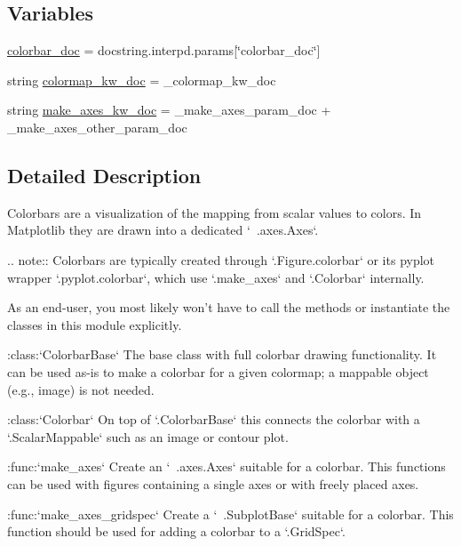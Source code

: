 \subsection*{Variables}
\begin{DoxyCompactItemize}
\item 
\hyperlink{namespacematplotlib_1_1colorbar_a7ca9324c365b59716ce5f7d1521c64d7}{colorbar\+\_\+doc} = docstring.\+interpd.\+params\mbox{[}\char`\"{}colorbar\+\_\+doc\char`\"{}\mbox{]}
\item 
string \hyperlink{namespacematplotlib_1_1colorbar_a68af3613ba2c4b30bcfe5ba521813a37}{colormap\+\_\+kw\+\_\+doc} = \+\_\+colormap\+\_\+kw\+\_\+doc
\item 
string \hyperlink{namespacematplotlib_1_1colorbar_aa0da54385128a6f272b1328022e852d0}{make\+\_\+axes\+\_\+kw\+\_\+doc} = \+\_\+make\+\_\+axes\+\_\+param\+\_\+doc + \+\_\+make\+\_\+axes\+\_\+other\+\_\+param\+\_\+doc
\end{DoxyCompactItemize}


\subsection{Detailed Description}
\begin{DoxyVerb}Colorbars are a visualization of the mapping from scalar values to colors.
In Matplotlib they are drawn into a dedicated `~.axes.Axes`.

.. note::
   Colorbars are typically created through `.Figure.colorbar` or its pyplot
   wrapper `.pyplot.colorbar`, which use `.make_axes` and `.Colorbar`
   internally.

   As an end-user, you most likely won't have to call the methods or
   instantiate the classes in this module explicitly.

:class:`ColorbarBase`
    The base class with full colorbar drawing functionality.
    It can be used as-is to make a colorbar for a given colormap;
    a mappable object (e.g., image) is not needed.

:class:`Colorbar`
    On top of `.ColorbarBase` this connects the colorbar with a
    `.ScalarMappable` such as an image or contour plot.

:func:`make_axes`
    Create an `~.axes.Axes` suitable for a colorbar. This functions can be
    used with figures containing a single axes or with freely placed axes.

:func:`make_axes_gridspec`
    Create a `~.SubplotBase` suitable for a colorbar. This function should
    be used for adding a colorbar to a `.GridSpec`.
\end{DoxyVerb}
 

